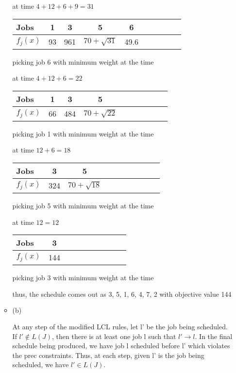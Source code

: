 \documentclass[12pt]{article}
\begin{document}
\begin{enumerate}
\begin{itemize}
at time $4 + 12 + 6 + 9 = 31$
\begin{center}
\begin{tabular}{l*{8}{c}r}
Jobs          & 1 & 3 & 5 & 6                                       \\
\hline
$f_{j}(x)$    & 93 & 961 & $70 + \sqrt{31}$ & 49.6               \\
\end{tabular}
\end{center}
picking job 6 with minimum weight at the time

at time $4 + 12 + 6 = 22$
\begin{center}
\begin{tabular}{l*{8}{c}r}
Jobs          & 1 & 3 & 5                                 \\
\hline
$f_{j}(x)$    & 66 & 484 & $70 + \sqrt{22}$               \\
\end{tabular}
\end{center}
picking job 1 with minimum weight at the time

at time $12 + 6 = 18$
\begin{center}
\begin{tabular}{l*{8}{c}r}
Jobs          & 3 & 5                                 \\
\hline
$f_{j}(x)$    & 324 & $70 + \sqrt{18}$                \\
\end{tabular}
\end{center}
picking job 5 with minimum weight at the time

at time $12 = 12$
\begin{center}
\begin{tabular}{l*{8}{c}r}
Jobs          & 3                      \\
\hline
$f_{j}(x)$    & 144                    \\
\end{tabular}
\end{center}
picking job 3 with minimum weight at the time

thus, the schedule comes out as 3, 5, 1, 6, 4, 7, 2 with objective value 144

\item{(b)}

At any step of the modified LCL rules, let l' be the job being scheduled. If $l' \not\in L(J)$, then there is at least one job l such that $l' \to l$. In the final schedule being produced, we have job l scheduled before l' which violates the prec constraints. Thus, at each step, given l' is the job being scheduled, we have $l' \in L(J)$.


\end{itemize}
\end{enumerate}
\end{document}
